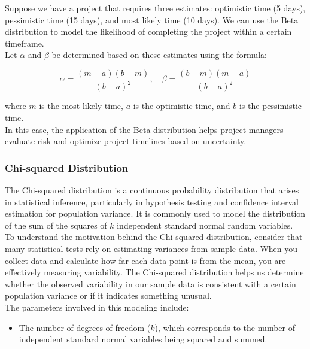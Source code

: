 \begin{example}
    Suppose we have a project that requires three estimates: optimistic time (5 days), pessimistic time (15 days), and most likely time (10 days). We can use the Beta distribution to model the likelihood of completing the project within a certain timeframe. \\

    Let \(\alpha\) and \(\beta\) be determined based on these estimates using the formula:

\[
\alpha = \frac{(m - a)(b - m)}{(b - a)^2}, \quad \beta = \frac{(b - m)(m - a)}{(b - a)^2}
\]

where \(m\) is the most likely time, \(a\) is the optimistic time, and \(b\) is the pessimistic time.\\

In this case, the application of the Beta distribution helps project managers evaluate risk and optimize project timelines based on uncertainty.
\end{example}

\subsubsection{Chi-squared Distribution}
The Chi-squared distribution is a continuous probability distribution that arises in statistical inference, particularly in hypothesis testing and confidence interval estimation for population variance. It is commonly used to model the distribution of the sum of the squares of $k$ independent standard normal random variables. \\

To understand the motivation behind the Chi-squared distribution, consider that many statistical tests rely on estimating variances from sample data. When you collect data and calculate how far each data point is from the mean, you are effectively measuring variability. The Chi-squared distribution helps us determine whether the observed variability in our sample data is consistent with a certain population variance or if it indicates something unusual.\\

The parameters involved in this modeling include:
\begin{itemize}
    \item The number of degrees of freedom ($k$), which corresponds to the number of independent standard normal variables being squared and summed.
\end{itemize}

